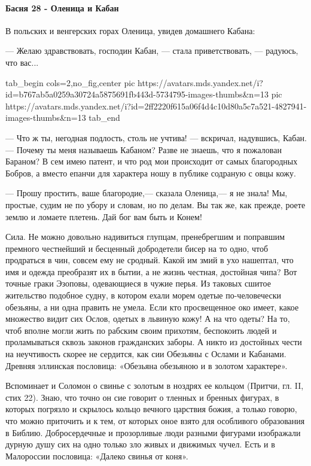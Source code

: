 
 
 
 
 

\paragraph{Басня 28 - Оленица и Кабан}

В польских и венгерских горах Оленица, увидев домашнего Кабана:

— Желаю здравствовать, господин Кабан, — стала приветствовать, — радуюсь, что
вас...

\ifcmt
  tab_begin cols=2,no_fig,center
     pic https://avatars.mds.yandex.net/i?id=b767ab5a0259a30724a5875691fb443d-5734795-images-thumbs&n=13
		 pic https://avatars.mds.yandex.net/i?id=2ff2220f615a06f4d4c10d80a5c7a521-4827941-images-thumbs&n=13
  tab_end
\fi

— Что ж ты, негодная подлость, столь не учтива! — вскричал, надувшись, Кабан.—
Почему ты меня называешь Кабаном? Разве не знаешь, что я пожалован Бараном? В
сем имею патент, и что род мои происходит от самых благородных Бобров, а вместо
епанчи для характера ношу в публике содраную с овцы кожу.

— Прошу простить, ваше благородие,— сказала Оленица,— я не знала! Мы, простые,
судим не по убору и словам, но по делам. Вы так же, как прежде, роете землю и
ломаете плетень. Дай бог вам быть и Конем!

Сила. Не можно довольно надивиться глупцам, пренебрегшим и поправшим премного
честнейший и бесценный добродетели бисер на то одно, чтоб продраться в чин,
совсем ему не сродный. Какой им змий в ухо нашептал, что имя и одежда
преобразят их в бытии, а не жизнь честная, достойная чипа? Вот точные граки
Эзоповы, одевающиеся в чужие перья. Из таковых сшитое жительство подобное
судну, в котором ехали морем одетые по-человечески обезьяны, а ни одна править
не умела. Если кто просвещенное око имеет, какое множество видит сих Ослов,
одетых в львиную кожу! А на что одеты? На то, чтоб вполне могли жить по рабским
своим прихотям, беспокоить людей и проламываться сквозь законов гражданских
заборы. А никто из достойных чести на неучтивость скорее не сердится, как сии
Обезьяны с Ослами и Кабанами. Древняя эллинская пословица: «Обезьяна обезьяною
и в золотом характере».

Вспоминает и Соломон о свинье с золотым в ноздрях ее кольцом (Притчи, гл. II,
стих 22). Знаю, что точно он сие говорит о тленных и бренных фигурах, в которых
погрязло и скрылось кольцо вечного царствия божия, а только говорю, что можно
приточить и к тем, от которых оное взято для особливого образования в Библию.
Добросердечные и прозорливые люди разными фигурами изображали дурную душу сих
на одно только зло живых и движимых чучел. Есть и в Малороссии пословица:
«Далеко свинья от коня». 

